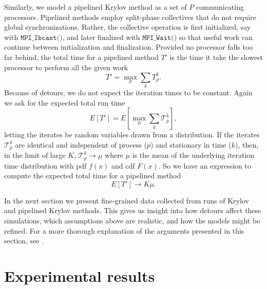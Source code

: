 \documentclass[sigconf, anonymous]{acmart}
\begin{document}
Similarly, we model a pipelined Krylov method as a set of $P$ communicating processors. Pipelined methods employ split-phase collectives that do not require global synchronizations. Rather, the collective operation is first initialized, say with  ${\texttt{MPI\_Ibcast()}}$, and later finalized with ${\texttt{MPI\_Wait()}}$ so that useful work can continue between initialization and finalization. 
Provided no processor falls too far behind, the total time for a pipelined method $T'$ is the time it take the slowest processor to perform all the given work 
\begin{equation}
T' = \max_p \sum_k T^k_p.
\end{equation}
Because of detours, we do not expect the iteration times to be constant. Again we ask for the expected total run time
\begin{equation}
E[T'] = E[\max_p \sum_k \mathcal{T}^k_p], \label{eq:pipeline-expression}
\end{equation}
letting the iterates be random variables drawn from a distribution. 
If the iterates $\mathcal{T}^k_p$ are identical and independent of process ($p$) and stationary in time ($k$), then, in the limit of large $K$, $\mathcal{T}^k_p \rightarrow \mu$ where $\mu$ is the mean of the underlying iteration time distribution with pdf $f(x)$ and cdf $F(x)$. So we have an expression to compute the expected total time for a pipelined method
\begin{equation}
E[T'] \rightarrow K\mu. \label{eq:pipeline-model}
\end{equation}

In the next section we present fine-grained data collected from runs of Krylov and pipelined Krylov methods. This gives us insight into how detours affect these simulations, which assumptions above are realistic, and how the models might be refined. For a more thorough explanation of the arguments presented in this section, see \cite{morgan2016krylov}.

\section{Experimental results} \label{sec:experimental-results}
\end{document}
